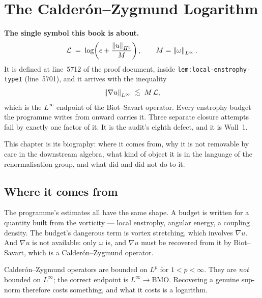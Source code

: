 \chapter{\texorpdfstring{The Calder\'on--Zygmund Logarithm}{The Calderon-Zygmund Logarithm}}
\label{ch:cz-log}

\begin{record}
\textbf{The single symbol this book is about.}
\[
  \mathcal{L} \;=\; \log\!\left(e + \frac{\left\|u\right\|_{H^3}}{M}\right),
  \qquad M=\left\|\omega\right\|_{L^\infty}.
\]
It is defined at line~5712 of the proof document, inside
\texttt{lem:local-enstrophy-typeI} (line~5701), and it arrives with the
inequality
\begin{equation}\label{eq:cz-endpoint}
  \left\|\nabla u\right\|_{L^\infty} \;\lesssim\; M\,\mathcal{L} ,
\end{equation}
which is the \(L^\infty\) endpoint of the Biot--Savart operator. Every
enstrophy budget the programme writes from  onward carries it. Three
separate closure attempts fail by exactly one factor of it. It is the audit's
eighth defect, and it is Wall~1.

\smallskip
This chapter is its biography: where it comes from, why it is not removable by
care in the downstream algebra, what kind of object it is in the language of
the renormalisation group, and what  did and did not do to it.
\end{record}

\section{Where it comes from}
\label{sec:cz-origin}

The programme's estimates all have the same shape. A budget is written for a
quantity built from the vorticity --- local enstrophy, angular energy, a
coupling density. The budget's dangerous term is vortex stretching, which
involves \(\nabla u\). And \(\nabla u\) is not available: only \(\omega\) is,
and \(\nabla u\) must be recovered from it by Biot--Savart, which is a
Calder\'on--Zygmund operator.

Calder\'on--Zygmund operators are bounded on \(L^p\) for \(1<p<\infty\). They
are \emph{not} bounded on \(L^\infty\); the correct endpoint is
\(L^\infty\to\mathrm{BMO}\). Recovering a genuine sup-norm therefore costs
something, and what it costs is a logarithm.

